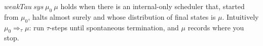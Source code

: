 \begin{definition}
  \label{def:weaktau}
  \leanok
  $weakTau\ sys\ \mu_0\ \mu$ holds when there is an internal-only scheduler that, started from $\mu_0$, halts almost surely and whose distribution of final states is $\mu$.
  Intuitively $\mu_0 \Rightarrow_\tau \mu$: run $\tau$-steps until spontaneous termination, and $\mu$ records where you stop.
\end{definition}
